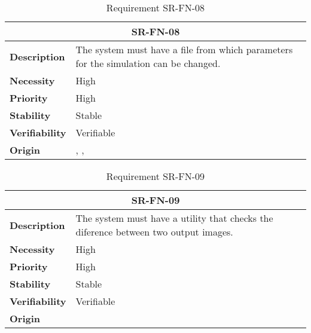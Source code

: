 \begin{table}[H]
    \centering
    \begin{tabular}{l p{10cm}}
        \toprule
        \multicolumn{2}{c}{SR-FN-08} \\
        \toprule
        \textbf{Description}        &  The system must have a file from which parameters for the simulation can be changed. \\
        \textbf{Necessity}          &  High \\
        \textbf{Priority}           &  High \\
        \textbf{Stability}          &  Stable \\
        \textbf{Verifiability}      & Verifiable \\
        \textbf{Origin}             & \textit{\nameref{tab:ur-ca-05}}, \textit{\nameref{tab:ur-ca-06}}, \textit{\nameref{tab:ur-ca-14}} \\
    \end{tabular}
    \caption{Requirement SR-FN-08}
    \label{tab:sr-fn-08}
\end{table}

\begin{table}[H]
    \centering
    \begin{tabular}{l p{10cm}}
        \toprule
        \multicolumn{2}{c}{SR-FN-09} \\
        \toprule
        \textbf{Description}        &  The system must have a utility that checks the diference between two output images. \\
        \textbf{Necessity}          &  High \\
        \textbf{Priority}           &  High \\
        \textbf{Stability}          &  Stable \\
        \textbf{Verifiability}      & Verifiable \\
        \textbf{Origin}             & \textit{\nameref{tab:ur-ca-04}} \\
    \end{tabular}
    \caption{Requirement SR-FN-09}
    \label{tab:sr-fn-09}
\end{table}


